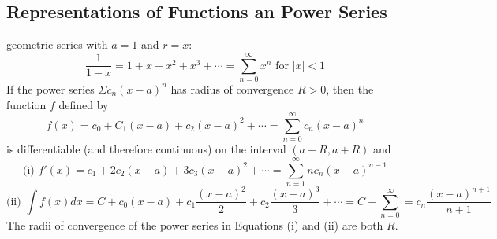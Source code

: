 \documentclass{article}
\begin{document}
    \subsection{Representations of Functions an Power Series}
    \begin{outline}
        \1 geometric series with \(a=1\) and \(r=x\): \[\dfrac{1}{1-x}=1+x+x^2+x^3+\cdots=\sum^\infty_{n=0}x^n\mbox{ for }|x|<1\]
        \1 If the power series \(\Sigma c_n(x-a)^n\) has radius of convergence \(R>0\), then the function $f$ defined by \[f(x)=c_0+C_1(x-a)+c_2(x-a)^2+\cdots=\sum_{n=0}^\infty c_n(x-a)^n\] is differentiable (and therefore continuous) on the interval \((a-R, a+R)\) and \[\text{(i) }f'(x)=c_1+2c_2(x-a)+3c_3(x-a)^2+\cdots=\sum^\infty_{n=1}nc_n(x-a)^{n-1}\]\[\text{(ii) }\int f(x)dx=C+c_0(x-a)+c_1\dfrac{(x-a)^2}{2}+c_2\dfrac{(x-a)^3}{3}+\cdots=C+\sum^\infty_{n=0}=c_n\dfrac{(x-a)^{n+1}}{n+1}\] The radii of convergence of the power series in Equations (i) and (ii) are both $R$. 

    \end{outline}
\end{document}
